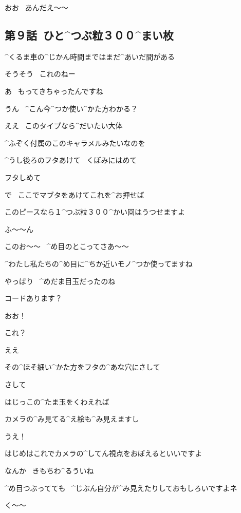 \Ojisan おお
\ あんだえ〜〜


\subsection{第９話\ ひと^{つぶ}{粒}３００^{まい}{枚}}

\page[20]
\Alpha ^{くるま}{車}の^{じかん}{時間}まではまだ^{あいだ}{間}がある

\page
\Alpha そうそう
\ これのねー

\Kokone あ
\ もってきちゃったんですね

\Alpha うん
\ ^{こん}{今}^{つか}{使}い^{かた}{方}わかる？

\Kokone ええ
\ このタイプなら^{だいたい}{大体}

\page
\Kokone ^{ふぞく}{付属}のこのキャラメルみたいなのを

\Kokone ^{うし}{後}ろのフタあけて
\ くぼみにはめて

\Kokone フタしめて

\Kokone で
\ ここでマブタをあけてこれを^{お}{押}せば

\Kokone このピースなら１^{つぶ}{粒}３００^{かい}{回}はうつせますよ

\Alpha ふ〜〜ん

\page
\Alpha このお〜〜
\ ^{め}{目}のとこってさあ〜〜

\Kokone ^{わたし}{私}たちの^{め}{目}に^{ちか}{近}いモノ^{つか}{使}ってますね

\Alpha やっぱり
\ ^{めだま}{目玉}だったのね

\page
\Kokone コードあります？

\Alpha おお！

\Alpha これ？

\Kokone ええ

\Kokone その^{ほそ}{細}い^{かた}{方}をフタの^{あな}{穴}にさして

\Alpha さして

\Kokone はじっこの^{たま}{玉}をくわえれば

\page
\Kokone カメラの^{み}{見}てる^{え}{絵}も^{み}{見}えますし

\Alpha うえ！

\Kokone はじめはこれでカメラの^{してん}{視点}をおぼえるといいですよ

\Alpha なんか
\ きもちわ^{る}{う}いね

\Kokone ^{め}{目}つぶってても
\ ^{じぶん}{自分}が^{み}{見}えたりしておもしろいですよネ

\Alpha く〜〜

